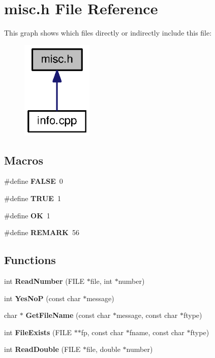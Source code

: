 \section{misc.\-h File Reference}
\label{misc_8h}
This graph shows which files directly or indirectly include this file\-:
\nopagebreak
\begin{figure}[H]
\begin{center}
\leavevmode
\includegraphics[width=96pt]{misc_8h__dep__incl}
\end{center}
\end{figure}
\subsection*{Macros}
\begin{DoxyCompactItemize}
\item 
\#define {\bf F\-A\-L\-S\-E}~0
\item 
\#define {\bf T\-R\-U\-E}~1
\item 
\#define {\bf O\-K}~1
\item 
\#define {\bf R\-E\-M\-A\-R\-K}~56
\end{DoxyCompactItemize}
\subsection*{Functions}
\begin{DoxyCompactItemize}
\item 
int {\bf Read\-Number} (F\-I\-L\-E $\ast$file, int $\ast$number)
\item 
int {\bf Yes\-No\-P} (const char $\ast$message)
\item 
char $\ast$ {\bf Get\-File\-Name} (const char $\ast$message, const char $\ast$ftype)
\item 
int {\bf File\-Exists} (F\-I\-L\-E $\ast$$\ast$fp, const char $\ast$fname, const char $\ast$ftype)
\item 
int {\bf Read\-Double} (F\-I\-L\-E $\ast$file, double $\ast$number)
\end{DoxyCompactItemize}


